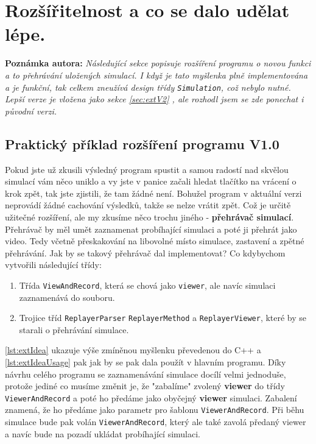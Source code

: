 \chapter{Rozšířitelnost a co se dalo udělat lépe.}
\textbf{Poznámka autora: }\textit{Následující sekce popisuje rozšíření programu o novou funkci a to přehrávání uložených simulací. I když je tato myšlenka plně implementována a je funkční, tak celkem zneužívá design třídy \texttt{Simulation}, což nebylo nutné. Lepší verze je vložena jako sekce \ref{sec:extV2} , ale rozhodl jsem se zde ponechat i původní verzi. }
\section{Praktický příklad rozšíření programu V1.0}

Pokud jste už zkusili výsledný program spustit a samou radostí nad skvělou simulací vám něco uniklo a vy jste v panice začali hledat tlačítko na vrácení o krok zpět, tak jste zjistili, že tam žádné není. Bohužel program v aktuální verzi neprovádí žádné cachování výsledků, takže se nelze vrátit zpět. Což je určitě užitečné rozšíření, ale my zkusíme něco trochu jiného - \textbf{přehrávač simulací}.
Přehrávač by měl umět zaznamenat probíhající simulaci a poté ji přehrát jako video. Tedy včetně přeskakování na libovolné místo simulace, zastavení a zpětné přehrávání.
Jak by se takový přehrávač dal implementovat?
Co kdybychom vytvořili následující třídy:
\begin{enumerate}
	\item Třída \texttt{ViewAndRecord}, která se chová jako \texttt{viewer}, ale navíc simulaci zaznamenává do souboru. 
	\item Trojice tříd \texttt{ReplayerParser} \texttt{ReplayerMethod} a \texttt{ReplayerViewer}, které by se starali o přehrávání simulace.
\end{enumerate}
\ref{lst:extIdea} ukazuje výše zmíněnou myšlenku převedenou do C++ a  \ref{lst:extIdeaUsage} pak jak by se pak dala použít v hlavním programu.
Díky návrhu celého programu se zaznamenávání simulace docílí velmi jednoduše, protože jediné co musíme změnit je, že "zabalíme" zvolený \textbf{viewer} do třídy \texttt{ViewerAndRecord} a poté ho předáme jako obyčejný \textbf{viewer} simulaci. Zabalení znamená, že ho předáme jako parametr pro šablonu \texttt{ViewerAndRecord}. Při běhu simulace bude pak volán \texttt{ViewerAndRecord}, který ale také zavolá předaný viewer a navíc bude na pozadí ukládat probíhající simulaci.

